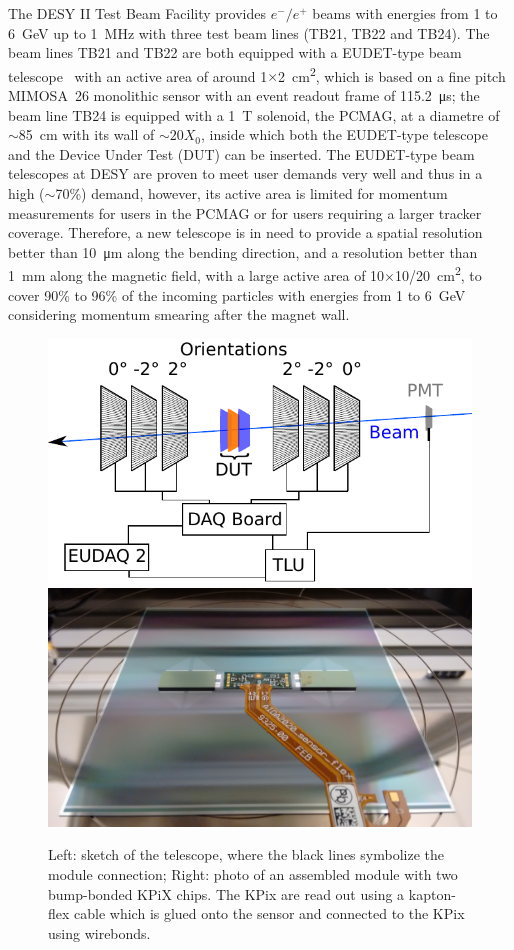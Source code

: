 The DESY II Test Beam Facility\cite{desytbf} provides $e^-/e^+$ beams with energies from 1 to \SI{6}{\GeV} up to \SI{1}{\MHz}
with three test beam lines (TB21, TB22 and TB24).
The beam lines TB21 and TB22 are both equipped with a EUDET-type beam telescope~\cite{eudet} with an active area of around 1$\times$\SI{2}{\square\centi\metre},
which is based on a fine pitch \uppercase{mimosa}~26 monolithic sensor with an event readout frame of \SI{115.2}{\micro\second};
the beam line TB24 is equipped with a \SI{1}{\tesla} solenoid, the PCMAG, at a diametre of $\sim$\SI{85}{\centi\metre} with its wall of $\sim20X_0$,
inside which both the EUDET-type telescope and the Device Under Test (DUT) can be inserted.
The EUDET-type beam telescopes at DESY are proven to meet user demands very well and thus in a high ($\sim$70\%) demand,
however, its active area is limited for momentum measurements for users in the PCMAG or for users requiring a larger tracker coverage.
Therefore, a new telescope is in need to provide a spatial resolution better than \SI{10}{\micro\metre} along the bending direction,
and a resolution better than \SI{1}{\milli\metre} along the magnetic field,
with a large active area of 10$\times$10/\SI{20}{\square\centi\metre},
to cover 90\% to 96\% of the incoming particles with energies from 1 to \SI{6}{\GeV} considering momentum smearing after the magnet wall.

\begin{figure}[!ht]%
\centering
\includegraphics[width=0.49\linewidth]{pics/principle.pdf}
\includegraphics[width=0.49\linewidth]{pics/sensor_module1.jpg}
\caption{Left: sketch of the \lycoris telescope, where the black lines symbolize the module connection;
Right: photo of an assembled module with two bump-bonded KPiX chips. The KPix are read out using a kapton-flex cable which is glued onto the sensor and connected to the KPix using wirebonds.}%
\label{fig:1figs}%
\end{figure}

